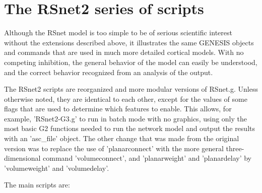 \documentclass[10pt,a4paper,english]{article}
\begin{document}

\hypertarget{the-rsnet2-series-of-scripts}{}
\section*{The RSnet2 series of scripts}
\label{the-rsnet2-series-of-scripts}

Although the RSnet model is too simple to be of serious scientific interest
without the extensions described above, it illustrates the same GENESIS
objects and commands that are used in much more detailed cortical models.
With no competing inhibition, the general behavior of the model can easily
be understood, and the correct behavior recognized from an analysis of the
output.

The RSnet2 scripts are reorganized and more modular versions of RSnet.g.
Unless otherwise noted, they are identical to each other, except for the
values of some flags that are used to determine which features to enable.
This allows, for example, 'RSnet2-G3.g' to run in batch mode with no
graphics, using only the most basic G2 functions needed to run the network
model and output the results with an 'asc{\_}file' object.  The other change
that was made from the original version was to replace the use of
'planarconnect' with the more general three-dimensional command
'volumeconnect', and 'planarweight' and 'planardelay' by 'volumeweight' and
'volumedelay'.

The main scripts are:
\end{document}
